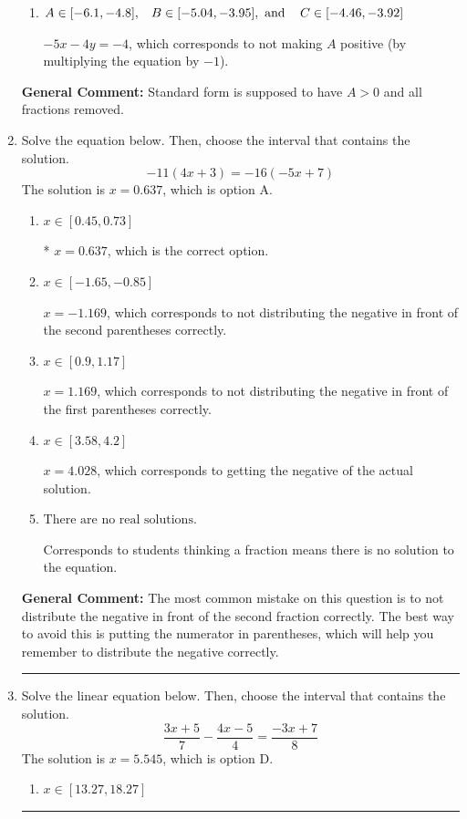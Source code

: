 \documentclass{extbook}[14pt]
\newcommand{\litem}[1]{\item #1

\rule{\textwidth}{0.4pt}}
\begin{document}
\begin{enumerate}
{\begin{enumerate}[label=\Alph*.]
 $5x - 4y = -4$, which corresponds to using the opposite (negative) slope of the graph, but did everything else correctly.
\item \( A \in [-6.1, -4.8], \hspace{3mm} B \in [-5.04, -3.95], \text{ and } \hspace{3mm} C \in [-4.46, -3.92] \)

 $-5x - 4y = -4$, which corresponds to not making $A$ positive (by multiplying the equation by $-1$).
\end{enumerate}

\textbf{General Comment:} Standard form is supposed to have $A > 0$ and all fractions removed.
}
\litem{
Solve the equation below. Then, choose the interval that contains the solution.
\[ -11(4x + 3) = -16(-5x + 7) \]The solution is \( x = 0.637 \), which is option A.\begin{enumerate}[label=\Alph*.]
\item \( x \in [0.45, 0.73] \)

* $x = 0.637$, which is the correct option.
\item \( x \in [-1.65, -0.85] \)

$x = -1.169$, which corresponds to not distributing the negative in front of the second parentheses correctly.
\item \( x \in [0.9, 1.17] \)

$x = 1.169$, which corresponds to not distributing the negative in front of the first parentheses correctly.
\item \( x \in [3.58, 4.2] \)

$x = 4.028$, which corresponds to getting the negative of the actual solution.
\item \( \text{There are no real solutions.} \)

Corresponds to students thinking a fraction means there is no solution to the equation.
\end{enumerate}

\textbf{General Comment:} The most common mistake on this question is to not distribute the negative in front of the second fraction correctly. The best way to avoid this is putting the numerator in parentheses, which will help you remember to distribute the negative correctly.
}
\litem{
Solve the linear equation below. Then, choose the interval that contains the solution.
\[ \frac{3x + 5}{7} - \frac{4x -5}{4} = \frac{-3x + 7}{8} \]The solution is \( x = 5.545 \), which is option D.\begin{enumerate}[label=\Alph*.]
\item \( x \in [13.27, 18.27] \)


\end{enumerate}}
\end{enumerate}
\end{document}
